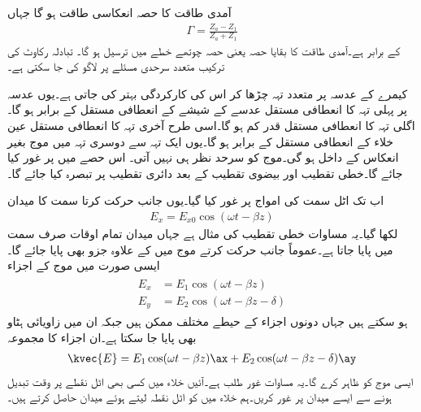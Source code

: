 آمدی طاقت کا  حصہ انعکاسی طاقت ہو گا جہاں
\begin{align}
\Gamma=\frac{Z_a-Z_1}{Z_a+Z_1}
\end{align}
کے برابر ہے۔آمدی طاقت کا بقایا حصہ یعنی  حصہ چوتھے خطے میں ترسیل ہو گا۔ تبادلہ رکاوٹ کی ترکیب متعدد سرحدی مسئلے پر لاگو کی جا سکتی ہے۔

کیمرے کے عدسہ پر متعدد تہہ چڑھا کر اس کی کارکردگی بہتر کی جاتی ہے۔یوں عدسہ پر پہلی تہہ کا انعطافی مستقل عدسے کے شیشے کے انعطافی مستقل کے برابر ہو گا۔اگلی تہہ کا انعطافی مستقل قدر کم ہو گا۔اسی طرح آخری تہہ کا انعطافی مستقل عین خلاء کے انعطافی مستقل کے برابر ہو گا۔یوں ایک تہہ سے دوسری تہہ میں موج بغیر انعکاس کے داخل ہو گی۔موج کو سرحد نظر ہی نہیں آتی۔  
اس حصے میں   پر غور کیا جائے گا۔خطی تقطیب اور بیضوی تقطیب کے بعد دائری تقطیب پر تبصرہ کیا جائے گا۔

اب تک اٹل سمت کی امواج پر غور کیا گیا۔یوں  جانب حرکت کرتا  سمت کا میدان
\begin{align}
E_x = E_{x0} \cos (\omega t -\beta z)
\end{align}
لکھا گیا۔یہ مساوات خطی تقطیب کی مثال ہے جہاں میدان تمام اوقات صرف  سمت میں پایا جاتا ہے۔عموماً  جانب حرکت کرتے موج میں  کے علاوہ  جزو بھی پایا جائے گا۔ایسی صورت میں موج کے اجزاء
\begin{gather}
\begin{aligned}\label{مساوات_قطبیت_عمومی_اجزاء}
E_x&=E_1 \cos (\omega t -\beta z)\\
E_y&=E_2 \cos (\omega t -\beta z -\delta)
\end{aligned}
\end{gather}
ہو سکتے ہیں جہاں دونوں اجزاء کے حیطے مختلف ممکن ہیں جبکہ ان میں زاویائی ہٹاو  بھی پایا جا سکتا ہے۔ان اجزاء کا مجموعہ
\begin{align}\label{مساوات_قطبیت_عمومی_مساوات}
\kvec{E}=E_1 \cos (\omega t -\beta z) \ax+E_2 \cos (\omega t -\beta z -\delta) \ay
\end{align}
ایسی موج کو ظاہر کرے گا۔یہ مساوات غور طلب ہے۔آئیں خلاء میں کسی بھی اٹل نقطے پر وقت تبدیل ہونے سے  ایسے میدان پر غور کریں۔ہم خلاء میں   کو اٹل نقطہ لیتے ہوئے  میدان حاصل کرتے ہیں۔

